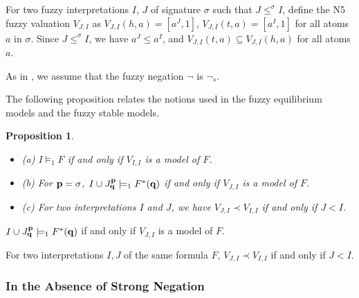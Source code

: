 \documentclass[runningheads]{llncs}
\def\bi{\begin{itemize}}
\def\ei{\end{itemize}}
\newtheorem{prop}{Proposition}
\begin{document}
\BOCCC
For two fuzzy interpretations $I$, $J$ of signature $\sigma$
such that $J\leq^\sigma I$, define the N5 fuzzy valuation $V_{J, I}$
as $V_{J, I}(h, a) =
\left[a^J, 1\right]$, $V_{J, I}(t, a) = \left[a^I, 1\right]$ for all
atoms $a$ in $\sigma$. 
Since  $J\leq^\sigma I$, we have $a^J \leq a^I$, 
and $V_{J,I}(t,a)\subseteq V_{J,I}(h,a)$ for all atoms $a$. 

As in \cite{schockaert12fuzzy}, we assume that the fuzzy negation
$\neg$ is $\neg_{\!s}$. 
%
%


The following proposition relates the notions used in the fuzzy
equilibrium models and the fuzzy stable models. 
\begin{prop}\label{prop:lem} 
\bi
\item[(a)]  $I\models_1 F$ if and only if $V_{I,I}$ is a model of $F$.
\item[(b)]  For ${\bf p}=\sigma$, $I\cup J^{\bf p}_{\bf q}\models_1 F^*({\bf q})$ 
            if and only if $V_{J, I}$ is a model of $F$.
\item[(c)]  For two interpretations $I$ and $J$, we have 
  $V_{J, I}\prec V_{I, I}$ if and only if $J < I$.
\ei
\end{prop}
\EOCCC

\BOCC
\begin{lemma}\label{clry_star_valuation}
$I\cup J^{\bf p}_{\bf q}\models_1 F^*({\bf q})$ 
if and only if $V_{J, I}$ is a model of $F$.
\end{lemma}

\begin{lemma}\label{lessthan_eq}
For two interpretations $I, J$ of the same formula $F$, $V_{J, I}
\prec V_{I, I}$ if and only if $J < I$.
\end{lemma}
\EOCC

\vspace{-3mm}
\subsubsection{In the Absence of Strong Negation}
\end{document}
